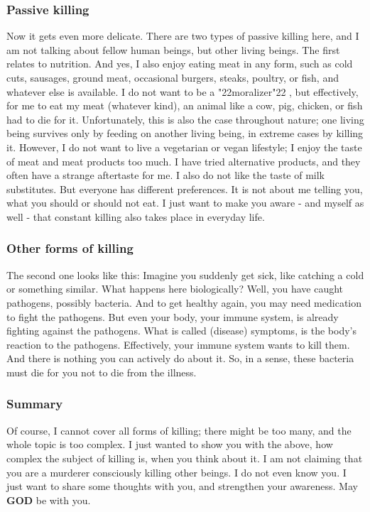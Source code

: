 \documentclass[10pt,a5paper]{article}
\newcommand{\God}[0]{\textbf{GOD}}
\newcommand{\q}[1]{\char"22{#1}\char"22 }
\begin{document}
	\subsubsection{Passive killing}
		Now it gets even more delicate.
		There are two types of passive killing here,
		and I am not talking about fellow human beings,
		but other living beings.
		The first relates to nutrition.
		And yes,
		I also enjoy eating meat in any form,
		such as cold cuts,
		sausages,
		ground meat,
		occasional burgers,
		steaks,
		poultry,
		or fish,
		and whatever else is available.
		I do not want to be a \q{moralizer},
		but effectively,
		for me to eat my meat (whatever kind),
		an animal like a cow,
		pig,
		chicken,
		or fish had to die for it.
		Unfortunately,
		this is also the case throughout nature;
		one living being survives only by feeding on another living being,
		in extreme cases by killing it.
		However,
		I do not want to live a vegetarian or vegan lifestyle;
		I enjoy the taste of meat and meat products too much.
		I have tried alternative products,
		and they often have a strange aftertaste for me.
		I also do not like the taste of milk substitutes.
		But everyone has different preferences.
		It is not about me telling you,
		what you should or should not eat.
		I just want to make you aware - and myself as well - that constant killing also takes place in everyday life.
		
	\subsubsection{Other forms of killing}
		The second one looks like this:
		Imagine you suddenly get sick,
		like catching a cold or something similar.
		What happens here biologically?
		Well,
		you have caught pathogens,
		possibly bacteria.
		And to get healthy again,
		you may need medication to fight the pathogens.
		But even your body,
		your immune system,
		is already fighting against the pathogens.
		What is called (disease) symptoms,
		is the body's reaction to the pathogens.
		Effectively,
		your immune system wants to kill them.
		And there is nothing you can actively do about it.
		So,
		in a sense,
		these bacteria must die for you not to die from the illness.

	\subsubsection{Summary}
		Of course,
		I cannot cover all forms of killing;
		there might be too many,
		and the whole topic is too complex.
		I just wanted to show you with the above,
		how complex the subject of killing is,
		when you think about it.
		I am not claiming that you are a murderer consciously killing other beings.
		I do not even know you.
		I just want to share some thoughts with you,
		and strengthen your awareness.
		May {\God} be with you.
\end{document}

